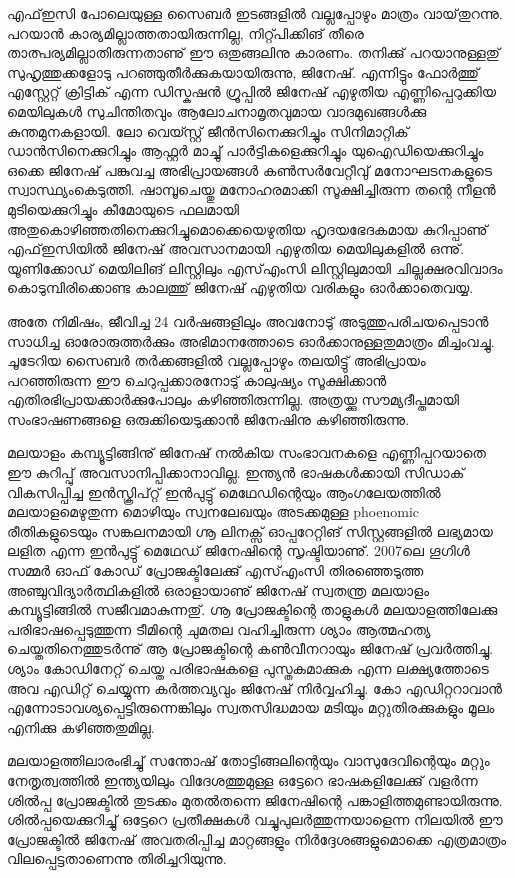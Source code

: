 എഫ്ഇസി പോലെയുള്ള സൈബര്‍ ഇടങ്ങളില്‍ വല്ലപ്പോഴും മാത്രം വായ്‌തുറന്നു. പറയാന്‍ കാര്യമില്ലാത്തതായിരുന്നില്ല, 
നിറ്റ്പിക്കിങ് തീരെ താത്പര്യമില്ലാതിരുന്നതാണു് ഈ ഒതുങ്ങലിനു കാരണം. തനിക്കു് പറയാനുള്ളതു് സുഹൃത്തുക്കളോടു 
പറഞ്ഞുതീര്‍ക്കുകയായിരുന്നു, ജിനേഷ്. എന്നിട്ടും ഫോര്‍ത്തു് എസ്റ്റേറ്റ് ക്രിട്ടിക്‍ എന്ന ഡിസ്കഷന്‍ ഗ്രൂപ്പില്‍ ജിനേഷ് എഴുതിയ 
എണ്ണിപ്പെറുക്കിയ മെയിലുകള്‍ സുചിന്തിതവും ആലോചനാമൃതവുമായ വാദമുഖങ്ങള്‍ക്കു കുന്തമുനകളായി. ലോ വെയ്സ്റ്റ് 
ജീന്‍സിനെക്കുറിച്ചും സിനിമാറ്റിക്‍ ഡാന്‍സിനെക്കുറിച്ചും ആഫ്റ്റര്‍ മാച്ചു് പാര്‍ട്ടികളെക്കുറിച്ചും യുഐഡിയെക്കുറിച്ചും ഒക്കെ 
ജിനേഷ് പങ്കുവച്ച അഭിപ്രായങ്ങള്‍ കണ്‍സര്‍വേറ്റീവു് മനോഘടനകളുടെ സ്വാസ്ഥ്യംകെടുത്തി. ഷാമ്പൂചെയ്തു മനോഹരമാക്കി 
സൂക്ഷിച്ചിരുന്ന തന്റെ നീളന്‍ മുടിയെക്കുറിച്ചും കീമോയുടെ ഫലമായി അതുകൊഴിഞ്ഞതിനെക്കുറിച്ചുമൊക്കെയെഴുതിയ 
ഹൃദയഭേദകമായ കുറിപ്പാണു് എഫ്ഇസിയില്‍ ജിനേഷ് അവസാനമായി എഴുതിയ മെയിലുകളില്‍ ഒന്നു്. യൂണിക്കോഡ് 
മെയിലിങ് ലിസ്റ്റിലും എസ്എംസി ലിസ്റ്റിലുമായി ചില്ലക്ഷരവിവാദം കൊടുമ്പിരിക്കൊണ്ട കാലത്തു് ജിനേഷ് എഴുതിയ വരികളും 
ഓര്‍ക്കാതെവയ്യ.

അതേ നിമിഷം, ജീവിച്ച 24 വര്‍ഷങ്ങളിലും അവനോടു് അടുത്തുപരിചയപ്പെടാന്‍ സാധിച്ച ഓരോരുത്തര്‍ക്കും അഭിമാനത്തോടെ 
ഓര്‍ക്കാനുള്ളതുമാത്രം മിച്ചംവച്ചു. ചൂടേറിയ സൈബര്‍ തര്‍ക്കങ്ങളില്‍ വല്ലപ്പോഴും തലയിട്ടു് അഭിപ്രായം പറഞ്ഞിരുന്ന ഈ 
ചെറുപ്പക്കാരനോടു് കാലുഷ്യം സൂക്ഷിക്കാന്‍ എതിരഭിപ്രായക്കാര്‍ക്കുപോലും കഴിഞ്ഞിരുന്നില്ല. അത്രയ്ക്കു സൗമ്യദീപ്തമായി 
സംഭാഷണങ്ങളെ ഒരുക്കിയെടുക്കാന്‍ ജിനേഷിനു കഴിഞ്ഞിരുന്നു.

മലയാളം കമ്പ്യൂട്ടിങ്ങിനു് ജിനേഷ് നല്‍കിയ സംഭാവനകളെ എണ്ണിപ്പറയാതെ ഈ കുറിപ്പു് അവസാനിപ്പിക്കാനാവില്ല. 
ഇന്ത്യന്‍ ഭാഷകള്‍ക്കായി സിഡാക്‍ വികസിപ്പിച്ച ഇന്‍സ്ക്രിപ്റ്റ് ഇന്‍പുട്ടു് മെഥേഡിന്റെയും ആംഗലേയത്തില്‍ മലയാളമെഴുതുന്ന 
മൊഴിയും സ്വനലേഖയും അടക്കമുള്ള phoenomic രീതികളുടെയും സങ്കലനമായി ഗ്നൂ ലിനക്സ് ഓപ്പറേറ്റിങ് സിസ്റ്റങ്ങളില്‍ ലഭ്യമായ 
ലളിത എന്ന ഇന്‍പുട്ടു് മെഥേഡ് ജിനേഷിന്റെ സൃഷ്ടിയാണു്. 2007ലെ ഗൂഗിള്‍ സമ്മര്‍ ഓഫ് കോഡ് പ്രോജക്ടിലേക്കു് എസ്എംസി 
തിരഞ്ഞെടുത്ത അഞ്ചുവിദ്യാര്‍ത്ഥികളില്‍ ഒരാളായാണു് ജിനേഷ് സ്വതന്ത്ര മലയാളം കമ്പ്യൂട്ടിങ്ങില്‍ സജീവമാകുന്നതു്. ഗ്നൂ 
പ്രോജക്ടിന്റെ താളുകള്‍ മലയാളത്തിലേക്കു പരിഭാഷപ്പെടുത്തുന്ന ടീമിന്റെ ചുമതല വഹിച്ചിരുന്ന ശ്യാം ആത്മഹത്യ 
ചെയ്തതിനെത്തുടര്‍ന്നു് ആ പ്രോജക്ടിന്റെ കണ്‍വീനറായും ജിനേഷ് പ്രവര്‍ത്തിച്ചു. ശ്യാം കോഡിനേറ്റ് ചെയ്ത പരിഭാഷകളെ 
പുസ്തകമാക്കുക എന്ന ലക്ഷ്യത്തോടെ അവ എഡിറ്റ് ചെയ്യുന്ന കര്‍ത്തവ്യവും ജിനേഷ് നിര്‍വ്വഹിച്ചു. കോ എഡിറ്ററാവാന്‍ 
എന്നോടാവശ്യപ്പെട്ടിരുന്നെങ്കിലും സ്വതസിദ്ധമായ മടിയും മറ്റുതിരക്കുകളും മൂലം എനിക്കു കഴിഞ്ഞതുമില്ല.

മലയാളത്തിലാരംഭിച്ചു് സന്തോഷ് തോട്ടിങ്ങലിന്റെയും വാസുദേവിന്റെയും മറ്റും നേതൃത്വത്തില്‍ ഇന്ത്യയിലും വിദേശത്തുമുള്ള ഒട്ടേറെ 
ഭാഷകളിലേക്കു് വളര്‍ന്ന ശില്‍പ്പ പ്രോജക്ടില്‍ തുടക്കം മുതല്‍തന്നെ ജിനേഷിന്റെ പങ്കാളിത്തമുണ്ടായിരുന്നു. ശില്‍പ്പയെക്കുറിച്ചു് 
ഒട്ടേറെ പ്രതീക്ഷകള്‍ വച്ചുപുലര്‍ത്തുന്നയാളെന്ന നിലയില്‍ ഈ പ്രോജക്ടില്‍ ജിനേഷ് അവതരിപ്പിച്ച മാറ്റങ്ങളും 
നിര്‍ദ്ദേശങ്ങളുമൊക്കെ എത്രമാത്രം വിലപ്പെട്ടതാണെന്നു തിരിച്ചറിയുന്നു.

